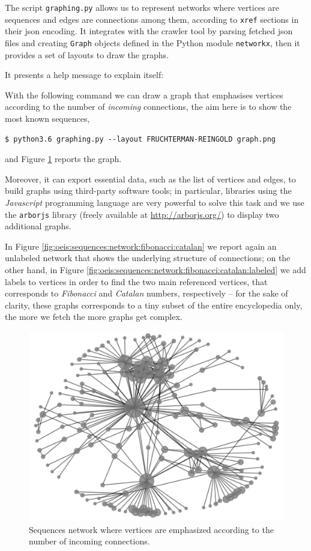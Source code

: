 The script \verb|graphing.py| allows us to represent networks where vertices
are sequences and edges are connections among them, according to \verb|xref|
sections in their json encoding. It integrates with the crawler tool by parsing
fetched json files and creating \verb|Graph| objects defined in the Python
module \verb|networkx|, then it provides a set of layouts to draw the graphs.

It presents a help message to explain itself:

With the following command we can draw a graph that emphasises vertices
according to the number of \textit{incoming} connections, the aim here is to
show the most known sequences,
\begin{Verbatim}[fontsize=\small]
$ python3.6 graphing.py --layout FRUCHTERMAN-REINGOLD graph.png
\end{Verbatim}
and Figure \ref{fig:oeis:sequences:network} reports the graph.

Moreover, it can export essential data, such as the list of vertices and edges,
to build graphs using third-party software tools; in particular, libraries
using the \textit{Javascript} programming language are very powerful to solve
this task and we use the \verb|arborjs| library (freely available at
\url{http://arborjs.org/}) to display two additional graphs.

In Figure \ref{fig:oeis:sequences:network:fibonacci:catalan} we report again an
unlabeled network that shows the underlying structure of connections; on the
other hand, in Figure
\ref{fig:oeis:sequences:network:fibonacci:catalan:labeled} we add labels to
vertices in order to find the two main referenced vertices, that corresponds to
\textit{Fibonacci} and \textit{Catalan} numbers, respectively -- for the sake
of clarity, these graphs corresponds to a tiny subset of the entire
encyclopedia only, the more we fetch the more graphs get complex.

\begin{figure}
\includegraphics{OEIS/graph1}
\caption{Sequences network where vertices are emphasized according to the
number of incoming connections.}
\label{fig:oeis:sequences:network}
\end{figure}

